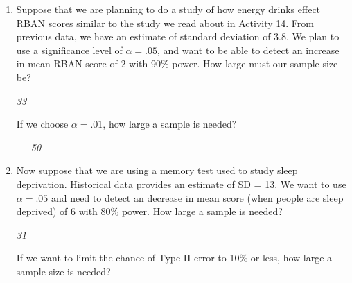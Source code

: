 \begin{enumerate}
\begin{key}
  {\it     It would decrease (power and significance level change in the
    same direction). }
\end{key}


  \item   Suppose that we are planning to do a study of how energy
    drinks effect RBAN scores similar to the study we read about in
    Activity 14.  From previous data, we have an estimate of standard
    deviation of 3.8. We plan to use a significance level of $\alpha =
    .05$, and want to be able to detect an increase in mean RBAN score
    of 2 with 90\% power.   How large must our sample size be?
\begin{students}
 \vspace{1cm} %
\end{students}

\begin{key}
  {\it  33}
\end{key}


      If we choose $\alpha = .01$, how large a sample is needed?
\begin{students}
 \vspace{1cm}
\end{students}
\begin{key}
\ \ \   {\it 50}
\end{key}

  \item  Now suppose that we are using a memory test used to study
    sleep deprivation.  Historical data 
    provides an estimate of SD = 13.  We want to use $\alpha = .05$ and
    need to detect an decrease in mean score (when people are sleep
    deprived) of 6 with 80\% power.  
    How large a sample is needed? 
\begin{students}
 \vspace{1cm} %
\end{students}

\begin{key}
  {\it  31}
\end{key}


    If we want to limit the chance of Type II error to 10\% or less,
    how large a sample size is needed? 
\begin{students}
 \vspace{1cm}\\
\end{students}


\end{enumerate}
